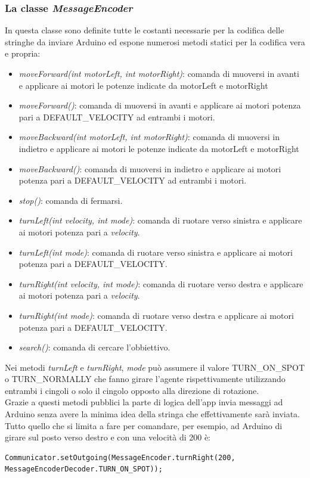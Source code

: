 \subsubsection{La classe \emph{MessageEncoder}}
In questa classe sono definite tutte le costanti necessarie per la codifica delle
stringhe da inviare Arduino ed espone numerosi metodi statici per la codifica vera e propria:
\begin{itemize}
    \item \emph{moveForward(int motorLeft, int motorRight)}: comanda di 
    muoversi in avanti e applicare ai motori le potenze indicate da motorLeft e motorRight
    \item \emph{moveForward()}: comanda di muoversi in avanti e applicare ai motori 
    potenza pari a DEFAULT\_VELOCITY ad entrambi i motori. 
    \item \emph{moveBackward(int motorLeft, int motorRight)}: comanda di 
    muoversi in indietro e applicare ai motori le potenze indicate da motorLeft e motorRight
    \item \emph{moveBackward()}: comanda di muoversi in indietro e applicare ai motori 
    potenza pari a DEFAULT\_VELOCITY ad entrambi i motori. 
    \item \emph{stop()}: comanda di fermarsi.
    \item \emph{turnLeft(int velocity, int mode)}: comanda di ruotare verso 
    sinistra e applicare ai motori potenza pari a \emph{velocity}.
    \item \emph{turnLeft(int mode)}: comanda di ruotare verso 
    sinistra e applicare ai motori potenza pari a DEFAULT\_VELOCITY.   
    \item \emph{turnRight(int velocity, int mode)}: comanda di ruotare verso 
    destra e applicare ai motori potenza pari a \emph{velocity}.
    \item \emph{turnRight(int mode)}: comanda di ruotare verso 
    destra e applicare ai motori potenza pari a DEFAULT\_VELOCITY.  
    \item \emph{search()}: comanda di cercare l'obbiettivo.
\end{itemize}
Nei metodi \emph{turnLeft} e \emph{turnRight}, \emph{mode} può assumere il valore 
TURN\_ON\_SPOT o TURN\_NORMALLY che fanno girare l'agente rispettivamente utilizzando 
entrambi i cingoli o solo il cingolo opposto alla direzione di rotazione.\\
Grazie a questi metodi pubblici la parte di logica dell'app invia messaggi ad Arduino
senza avere la minima idea della stringa che effettivamente sarà inviata.\\
Tutto quello che si limita a fare per comandare, per esempio, ad Arduino di girare 
sul posto verso destro e con una velocità di 200 è:
\begin{lstlisting}[caption=Esempio di codifica e invio di un comando ad Arduino]
Communicator.setOutgoing(MessageEncoder.turnRight(200, MessageEncoderDecoder.TURN_ON_SPOT));
\end{lstlisting}

